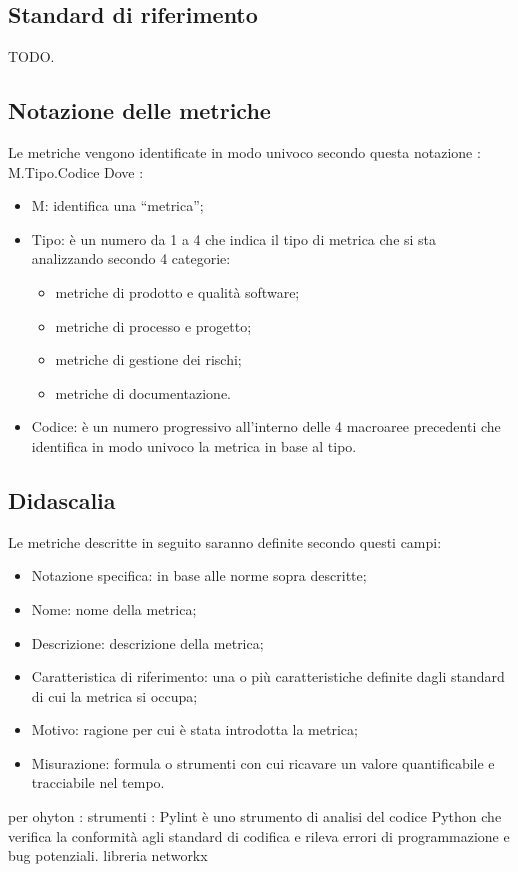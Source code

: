 \subsection{Standard di riferimento}

TODO.

\subsection{Notazione delle metriche}
Le metriche vengono identificate in modo univoco secondo questa notazione : M.Tipo.Codice
Dove : 
\begin{itemize}
    \item M: identifica una “metrica”;
    \item Tipo: è un numero da 1 a 4 che indica il tipo di metrica che si sta analizzando secondo 4 categorie: 
        \begin{itemize}
            \item metriche di prodotto e qualità software; 
            \item metriche di processo e progetto;
            \item metriche di gestione dei rischi;
            \item metriche di documentazione.
        \end{itemize}
    \item Codice: è un numero progressivo all’interno delle 4 macroaree precedenti che identifica in modo univoco la metrica in base al tipo.
\end{itemize}



\subsection{Didascalia}
Le metriche descritte in seguito saranno definite secondo questi campi: 
\begin{itemize}
    \item Notazione specifica: in base alle norme sopra descritte;
    \item Nome: nome della metrica;
    \item Descrizione: descrizione della metrica;
    \item Caratteristica di riferimento: una o più caratteristiche definite dagli standard di cui la metrica si occupa;
    \item Motivo: ragione per cui è stata introdotta la metrica;
    \item Misurazione: formula o strumenti con cui ricavare un valore quantificabile e tracciabile nel tempo.
\end{itemize}

per ohyton : 
strumenti : Pylint è uno strumento di analisi del codice Python che verifica la conformità agli standard di codifica e rileva errori di programmazione e bug potenziali.
libreria networkx

